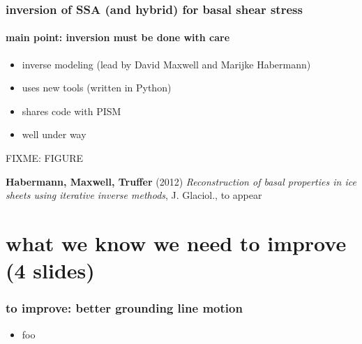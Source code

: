 \documentclass[hide notes,intlimits]{beamer}
\begin{document}
\begin{frame}
  \frametitle{inversion of SSA (and hybrid) for basal shear stress}
  \framesubtitle{main point: inversion must be done with care}

  \begin{itemize}
  \item inverse modeling (lead by David Maxwell and Marijke Habermann)
  \item uses new tools (written in Python)
  \item shares code with PISM
  \item well under way
  \end{itemize}

  \begin{center}
    FIXME: FIGURE
  \end{center}

\begin{flushleft}
\scriptsize \textbf{Habermann, Maxwell, Truffer} (2012) \emph{Reconstruction of basal properties in ice sheets using iterative inverse methods}, J. Glaciol., to appear
\end{flushleft}
\end{frame}


\section[to improve]{what we know we need to improve (4 slides)}

\begin{frame}
  \frametitle{to improve: better grounding line motion}
  \begin{itemize}
  \item foo
  \end{itemize}
\end{frame}
\end{document}
